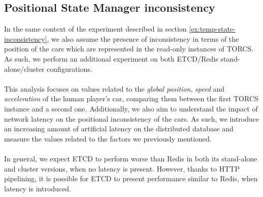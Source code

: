 \subsection{Positional State Manager inconsistency}
In the same context of the experiment described in section \ref{ex:temp-state-inconsistency}, we also assume the presence of inconsistency in terms of the position of the cars which are represented in the read-only instances of TORCS. As such, we perform an additional experiment on both ETCD/Redis stand-alone/cluster configurations. \\ \\
This analysis focuses on values related to the \textit{global position}, \textit{speed} and \textit{acceleration} of the human player's car, comparing them between the first TORCS instance and a second one. Additionally, we also aim to understand the impact of network latency on the positional inconsistency of the cars. As such, we introduce an increasing amount of artificial latency on the distributed database and measure the values related to the factors we previously mentioned. \\ \\
In general, we expect ETCD to perform worse than Redis in both its stand-alone and cluster versions, when no latency is present. However, thanks to HTTP pipelining, it is possible for ETCD to present performance similar to Redis, when latency is introduced.

